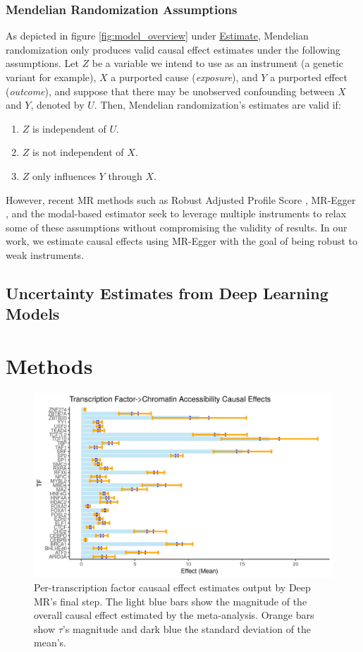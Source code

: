 \documentclass{article}
\begin{document}
\subsubsection{Mendelian Randomization Assumptions}
As depicted in figure \ref{fig:model_overview} under \underline{Estimate}, Mendelian randomization only produces valid causal effect estimates under the following assumptions. Let $ Z $ be a variable we intend to use as an instrument (a genetic variant for example), $ X $ a purported cause (\textit{exposure}), and $ Y $ a purported effect (\textit{outcome}), and suppose that there may be unobserved confounding between $ X $ and $ Y $, denoted by $ U $. Then, Mendelian randomization's estimates are valid if:
\begin{enumerate}
    \item $ Z $ is independent of $ U $.
    \item $ Z $ is not independent of $ X $.
    \item $ Z $ only influences $ Y $ through $ X $.
\end{enumerate}

However, recent MR methods such as Robust Adjusted Profile Score \cite{zhao2018statistical}, MR-Egger \cite{bowden2015mendelian}, and the modal-based estimator \cite{burgess2018modal} seek to leverage multiple instruments to relax some of these assumptions without compromising the validity of results. In our work, we estimate causal effects using MR-Egger with the goal of being robust to weak instruments.

\subsection{Uncertainty Estimates from Deep Learning Models}
\label{sec:dl_uncertainty}

\section{Methods}

\begin{figure}[ht]
    \centering
    \includegraphics[width=0.8\linewidth]{fig/overall_ces.png}
    \caption{Per-transcription factor causaal effect estimates output by Deep MR's final step. The light blue bars show the magnitude of the overall causal effect estimated by the meta-analysis. Orange bars show \( \tau \)'s magnitude and dark blue the standard deviation of the mean's.}
    \label{fig:overall_ces}
\end{figure}
\end{document}
